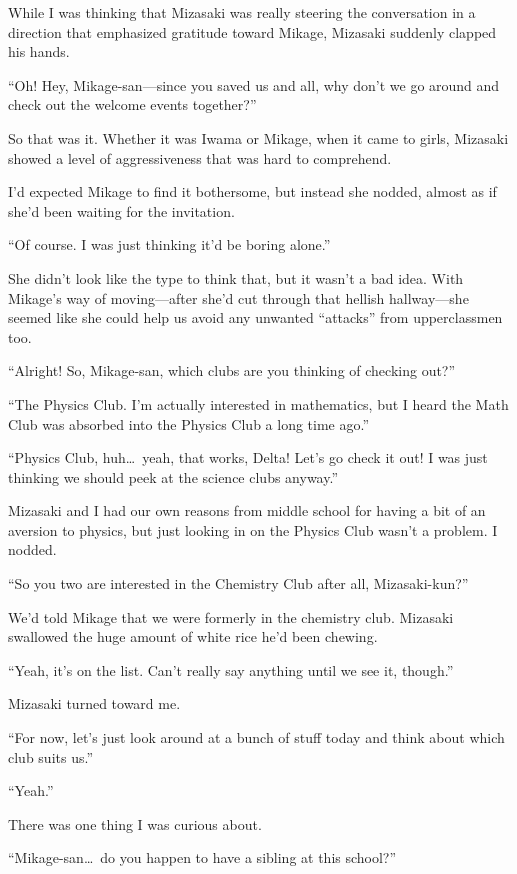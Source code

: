 \documentclass[
    a4paper,
    12pt,
    twoside,
    openany,
    UTF8,
    fontset=windows
]{ctexbook}
\begin{document}
While I was thinking that Mizasaki was really steering the conversation in a direction that emphasized gratitude toward Mikage, Mizasaki suddenly clapped his hands.

``Oh! Hey, Mikage-san---since you saved us and all, why don't we go around and check out the welcome events together?''

So that was it. Whether it was Iwama or Mikage, when it came to girls, Mizasaki showed a level of aggressiveness that was hard to comprehend.

I'd expected Mikage to find it bothersome, but instead she nodded, almost as if she'd been waiting for the invitation.

``Of course. I was just thinking it'd be boring alone.''

She didn't look like the type to think that, but it wasn't a bad idea. With Mikage's way of moving---after she'd cut through that hellish hallway---she seemed like she could help us avoid any unwanted ``attacks'' from upperclassmen too.

``Alright! So, Mikage-san, which clubs are you thinking of checking out?''

``The Physics Club. I'm actually interested in mathematics, but I heard the Math Club was absorbed into the Physics Club a long time ago.''

``Physics Club, huh\dots\ yeah, that works, Delta! Let's go check it out! I was just thinking we should peek at the science clubs anyway.''

Mizasaki and I had our own reasons from middle school for having a bit of an aversion to physics, but just looking in on the Physics Club wasn't a problem. I nodded.

``So you two are interested in the Chemistry Club after all, Mizasaki-kun?''

We'd told Mikage that we were formerly in the chemistry club. Mizasaki swallowed the huge amount of white rice he'd been chewing.

``Yeah, it's on the list. Can't really say anything until we see it, though.''

Mizasaki turned toward me.

``For now, let's just look around at a bunch of stuff today and think about which club suits us.''

``Yeah.''

There was one thing I was curious about.

``Mikage-san\dots\ do you happen to have a sibling at this school?''
\end{document}
